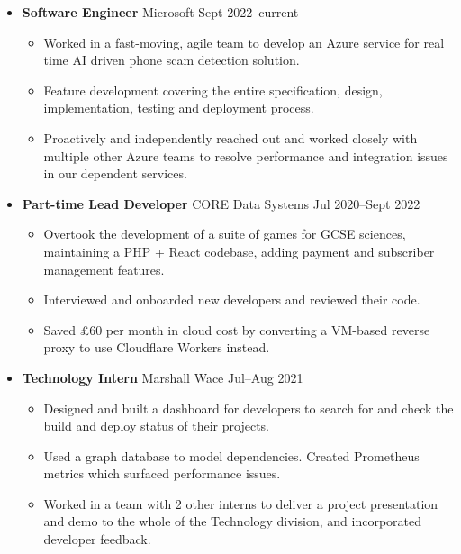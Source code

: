   \begin{itemize}
    \item \textbf{Software Engineer} %
    \dashdiv{} Microsoft \dashdiv{} Sept 2022--current

    \begin{itemize}
      \item Worked in a fast-moving, agile team to develop an Azure service for real time AI driven phone scam detection solution.
      \item Feature development covering the entire specification, design, implementation, testing and deployment process.
      \item Proactively and independently reached out and worked closely with multiple other Azure teams to resolve performance and integration issues in our dependent services.
    \end{itemize}

    \item \textbf{Part-time Lead Developer} \dashdiv{} CORE Data Systems \dashdiv{} Jul 2020--Sept 2022

    \begin{itemize}
      \item Overtook the development of a suite of games for GCSE sciences, maintaining a PHP + React codebase, adding payment and subscriber management features.
      \item Interviewed and onboarded new developers and reviewed their code.
      \item Saved £60 per month in cloud cost by converting a VM-based reverse proxy to use Cloudflare Workers instead.
    \end{itemize}

    \item \textbf{Technology Intern} \dashdiv{} Marshall Wace \dashdiv{} Jul--Aug 2021

    \begin{itemize}
      \item Designed and built a dashboard for developers to search for and check the build and deploy status of their projects.
      \item Used a graph database to model dependencies. Created Prometheus metrics which surfaced performance issues.
      \item Worked in a team with 2 other interns to deliver a project presentation and demo to the whole of the Technology division, and incorporated developer feedback.
    \end{itemize}

  \end{itemize}

